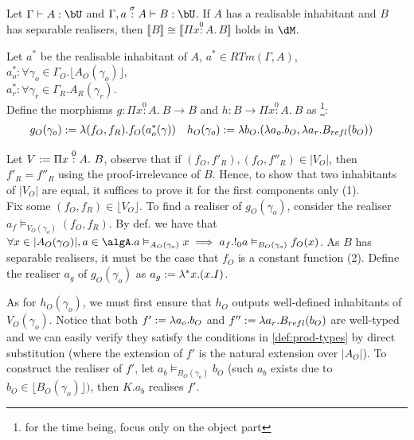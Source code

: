 \documentclass[12pt,a4paper]{article}
\def\rfl{_{refl}}
\renewcommand{\O}{_{O}}\alwaysmath{O}
\newcommand{\R}{\ensuremath{_{R}}}
\begin{document}
\begin{thm}
    Let $\Gamma \vdash A : \bU$ and $\Gamma, a \overset{\sigma}{:} A \vdash B : \bU$. If $A$ has a realisable inhabitant and $B$ has separable realisers, then $ \llbracket B \rrbracket \cong \llbracket \Pi x \overset{0}:A.\, B \rrbracket$ holds in $\dM$.
\end{thm}
Let $a^*$ be the realisable inhabitant of $A$, $a^* \in RTm(\Gamma, A)$, $a^*_o : \forall \gamma_o \in \Gamma\O.\lfloor A\O(\gamma_o) \rfloor$,\\ $a^*_r : \forall \gamma_r \in \Gamma\R . A\R(\gamma_r)$. \\
Define the morphisms $g : \Pi x \overset{0}:A.\ B \to B$ and $h : B \to \Pi x \overset{0}:A.\ B$ as \footnote{for the time being, focus only on the object part}:
\begin{align*}
{g\O}(\gamma_o) &\define \lambda (f\O, f\R). f\O(a^*_o(\gamma)) && {h\O}(\gamma_o) \define \lambda b\O. (\lambda a_o. b\O, \lambda a_r. B\rfl(b\O))
\end{align*}

Let $V \define \Pi x \overset{0}:A.\ B$, observe that if $(f\O, f'\R), (f\O, f''\R) \in |V\O|$, then $f'\R = f''\R$ using the proof-irrelevance of $B$. Hence, to show that two inhabitants of $|V\O|$ are equal, it suffices to prove it for the first components only (1).\\

Fix some $(f\O, f\R) \in \lfloor V\O \rfloor$. To find a realiser of $g\O(\gamma_o)$, consider the realiser $a_f \vDash_{V\O(\gamma_o)} (f\O, f\R)$. By def. we have that $\forall x \in |A\O(\gamma_O)|, a \in \algA . a \vDash_{A\O(\gamma_o)} x \implies a_f . !_0 a \vDash_{B\O(\gamma_o)} f\O(x)$. As $B$ has separable realisers, it must be the case that $f\O$ is a constant function (2). Define the realiser $a_g$ of $g\O(\gamma_o)$ as $a_g := \lambda^* x. (x . I)$.

As for $h\O(\gamma_o)$, we must first ensure that $h\O$ outputs well-defined inhabitants of $V\O(\gamma_o)$. Notice that both $f' \define \lambda a_o. b\O$ and $f'' \define \lambda a_r. B\rfl(b\O)$ are well-typed and we can easily verify they satisfy the conditions in \cref{def:prod-types} by direct substitution (where the extension of $f'$ is the natural extension over $|A\O|$). To construct the realiser of $f'$, let $a_b \vDash_{B\O(\gamma_o)} b\O$ (such $a_b$ exists due to $b\O \in \lfloor B\O(\gamma_o)\rfloor)$, then $K. a_b$ realises $f'$.\\
\end{document}
